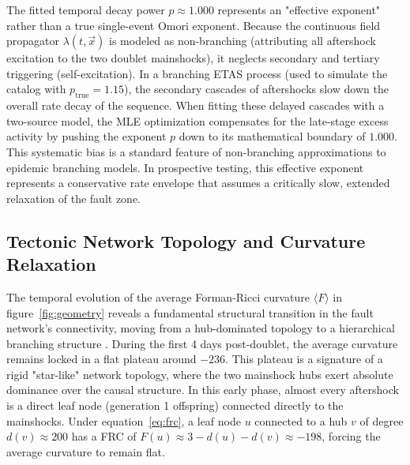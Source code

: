 \documentclass[twocolumn,amsmath,amssymb,aps,pre,superscriptaddress]{revtex4-1}
\begin{document}
The fitted temporal decay power $p \approx 1.000$ represents an "effective exponent" rather than a true single-event Omori exponent. Because the continuous field propagator $\lambda(t, \vec{x})$ is modeled as non-branching (attributing all aftershock excitation to the two doublet mainshocks), it neglects secondary and tertiary triggering (self-excitation). In a branching ETAS process (used to simulate the catalog with $p_{\text{true}} = 1.15$), the secondary cascades of aftershocks slow down the overall rate decay of the sequence. When fitting these delayed cascades with a two-source model, the MLE optimization compensates for the late-stage excess activity by pushing the exponent $p$ down to its mathematical boundary of $1.000$. This systematic bias is a standard feature of non-branching approximations to epidemic branching models. In prospective testing, this effective exponent represents a conservative rate envelope that assumes a critically slow, extended relaxation of the fault zone.

\subsection{Tectonic Network Topology and Curvature Relaxation}
The temporal evolution of the average Forman-Ricci curvature $\langle F \rangle$ in figure~\ref{fig:geometry} reveals a fundamental structural transition in the fault network's connectivity, moving from a hub-dominated topology to a hierarchical branching structure \cite{davidsen2005complex}. During the first 4 days post-doublet, the average curvature remains locked in a flat plateau around $-236$. This plateau is a signature of a rigid "star-like" network topology, where the two mainshock hubs exert absolute dominance over the causal structure. In this early phase, almost every aftershock is a direct leaf node (generation 1 offspring) connected directly to the mainshocks. Under equation~\eqref{eq:frc}, a leaf node $u$ connected to a hub $v$ of degree $d(v) \approx 200$ has a FRC of $F(u) \approx 3 - d(u) - d(v) \approx -198$, forcing the average curvature to remain flat.
\end{document}
